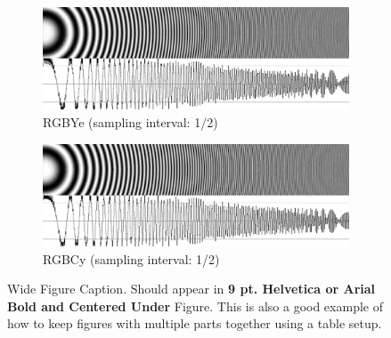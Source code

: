 \documentclass[9pt]{extarticle}
\begin{document}
\begin{figure}[h]
    \centering
    \begin{subfigure}[c]{7.75cm}
        \centering
        \includegraphics[width=\textwidth]{wave1}
        \caption{RGBYe (sampling interval: 1/2)}
        \label{fig:wave1}
    \end{subfigure}
    \hfill
    \begin{subfigure}[c]{7.75cm}
        \centering
        \includegraphics[width=\textwidth]{wave2}
        \caption{RGBCy (sampling interval: 1/2)}
        \label{fig:wave1}
    \end{subfigure}
    \caption{Wide Figure Caption. Should appear in \textbf{9 pt. Helvetica or Arial Bold and Centered Under} Figure. This is also a good example of how to keep figures with multiple parts together using a table setup.}
    \label{fig:waves}
\end{figure}
\end{document}
